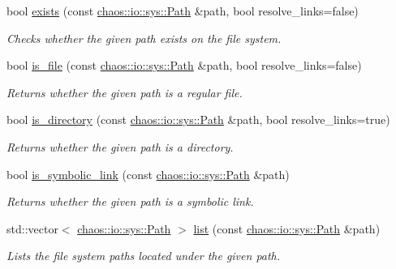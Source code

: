 \begin{DoxyCompactItemize}
\item 
bool \hyperlink{namespacechaos_1_1io_1_1sys_ae8f4abc1388c24e0ce7a655a50cd0212}{exists} (const \hyperlink{classchaos_1_1io_1_1sys_1_1_path}{chaos\+::io\+::sys\+::\+Path} \&path, bool resolve\+\_\+links=false)
\begin{DoxyCompactList}\small\item\em Checks whether the given path exists on the file system. \end{DoxyCompactList}\item 
bool \hyperlink{namespacechaos_1_1io_1_1sys_a2afa9dc6f049b03265731be671dbcb17}{is\+\_\+file} (const \hyperlink{classchaos_1_1io_1_1sys_1_1_path}{chaos\+::io\+::sys\+::\+Path} \&path, bool resolve\+\_\+links=false)
\begin{DoxyCompactList}\small\item\em Returns whether the given path is a regular file. \end{DoxyCompactList}\item 
bool \hyperlink{namespacechaos_1_1io_1_1sys_ad48945ad68ee4c84a37240ebc6b5a167}{is\+\_\+directory} (const \hyperlink{classchaos_1_1io_1_1sys_1_1_path}{chaos\+::io\+::sys\+::\+Path} \&path, bool resolve\+\_\+links=true)
\begin{DoxyCompactList}\small\item\em Returns whether the given path is a directory. \end{DoxyCompactList}\item 
bool \hyperlink{namespacechaos_1_1io_1_1sys_ac47b8476aea536b08a1c7a34b4e7e28c}{is\+\_\+symbolic\+\_\+link} (const \hyperlink{classchaos_1_1io_1_1sys_1_1_path}{chaos\+::io\+::sys\+::\+Path} \&path)
\begin{DoxyCompactList}\small\item\em Returns whether the given path is a symbolic link. \end{DoxyCompactList}\item 
std\+::vector$<$ \hyperlink{classchaos_1_1io_1_1sys_1_1_path}{chaos\+::io\+::sys\+::\+Path} $>$ \hyperlink{namespacechaos_1_1io_1_1sys_a21398064d60d0d4ac225a2c5004adf06}{list} (const \hyperlink{classchaos_1_1io_1_1sys_1_1_path}{chaos\+::io\+::sys\+::\+Path} \&path)
\begin{DoxyCompactList}\small\item\em Lists the file system paths located under the given path. \end{DoxyCompactList}\item 

\end{DoxyCompactItemize}
